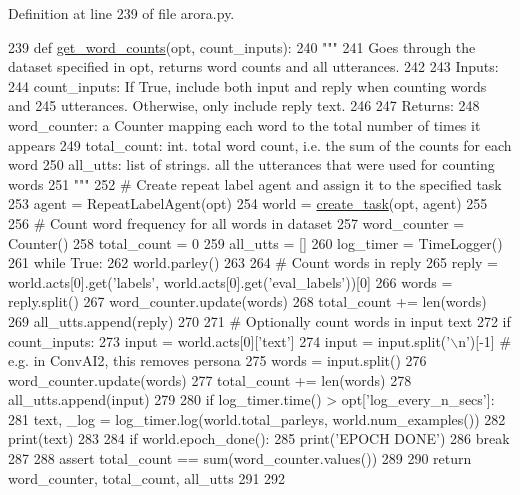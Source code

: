 Definition at line 239 of file arora.\+py.


\begin{DoxyCode}
239 \textcolor{keyword}{def }\hyperlink{namespaceprojects_1_1controllable__dialogue_1_1controllable__seq2seq_1_1arora_a2a5256a5d5666134bc2a89b0fe831fcd}{get\_word\_counts}(opt, count\_inputs):
240     \textcolor{stringliteral}{"""}
241 \textcolor{stringliteral}{    Goes through the dataset specified in opt, returns word counts and all utterances.}
242 \textcolor{stringliteral}{}
243 \textcolor{stringliteral}{    Inputs:}
244 \textcolor{stringliteral}{      count\_inputs: If True, include both input and reply when counting words and}
245 \textcolor{stringliteral}{        utterances. Otherwise, only include reply text.}
246 \textcolor{stringliteral}{}
247 \textcolor{stringliteral}{    Returns:}
248 \textcolor{stringliteral}{      word\_counter: a Counter mapping each word to the total number of times it appears}
249 \textcolor{stringliteral}{      total\_count: int. total word count, i.e. the sum of the counts for each word}
250 \textcolor{stringliteral}{      all\_utts: list of strings. all the utterances that were used for counting words}
251 \textcolor{stringliteral}{    """}
252     \textcolor{comment}{# Create repeat label agent and assign it to the specified task}
253     agent = RepeatLabelAgent(opt)
254     world = \hyperlink{namespaceparlai_1_1core_1_1worlds_a11923c10b545c7ecc1b08fe2242d9c2c}{create\_task}(opt, agent)
255 
256     \textcolor{comment}{# Count word frequency for all words in dataset}
257     word\_counter = Counter()
258     total\_count = 0
259     all\_utts = []
260     log\_timer = TimeLogger()
261     \textcolor{keywordflow}{while} \textcolor{keyword}{True}:
262         world.parley()
263 
264         \textcolor{comment}{# Count words in reply}
265         reply = world.acts[0].get(\textcolor{stringliteral}{'labels'}, world.acts[0].get(\textcolor{stringliteral}{'eval\_labels'}))[0]
266         words = reply.split()
267         word\_counter.update(words)
268         total\_count += len(words)
269         all\_utts.append(reply)
270 
271         \textcolor{comment}{# Optionally count words in input text}
272         \textcolor{keywordflow}{if} count\_inputs:
273             input = world.acts[0][\textcolor{stringliteral}{'text'}]
274             input = input.split(\textcolor{stringliteral}{'\(\backslash\)n'})[-1]  \textcolor{comment}{# e.g. in ConvAI2, this removes persona}
275             words = input.split()
276             word\_counter.update(words)
277             total\_count += len(words)
278             all\_utts.append(input)
279 
280         \textcolor{keywordflow}{if} log\_timer.time() > opt[\textcolor{stringliteral}{'log\_every\_n\_secs'}]:
281             text, \_log = log\_timer.log(world.total\_parleys, world.num\_examples())
282             print(text)
283 
284         \textcolor{keywordflow}{if} world.epoch\_done():
285             print(\textcolor{stringliteral}{'EPOCH DONE'})
286             \textcolor{keywordflow}{break}
287 
288     \textcolor{keyword}{assert} total\_count == sum(word\_counter.values())
289 
290     \textcolor{keywordflow}{return} word\_counter, total\_count, all\_utts
291 
292 
\end{DoxyCode}
